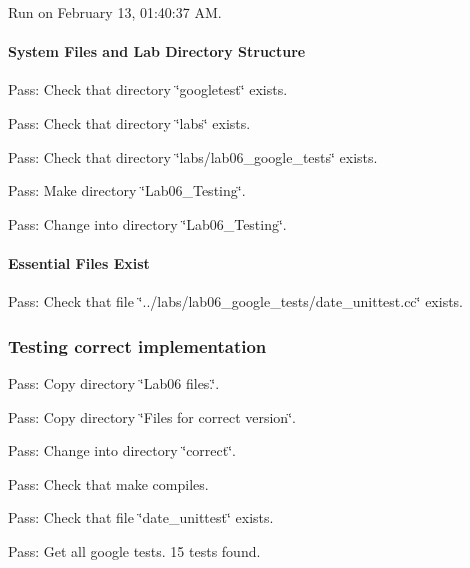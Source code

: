 Run on February 13, 01\+:40\+:37 AM.

\paragraph*{System Files and Lab Directory Structure}


\begin{DoxyItemize}
\item Pass\+: Check that directory \char`\"{}googletest\char`\"{} exists.
\item Pass\+: Check that directory \char`\"{}labs\char`\"{} exists.
\item Pass\+: Check that directory \char`\"{}labs/lab06\+\_\+google\+\_\+tests\char`\"{} exists.
\item Pass\+: Make directory \char`\"{}\+Lab06\+\_\+\+Testing\char`\"{}.
\item Pass\+: Change into directory \char`\"{}\+Lab06\+\_\+\+Testing\char`\"{}.
\end{DoxyItemize}

\paragraph*{Essential Files Exist}


\begin{DoxyItemize}
\item Pass\+: Check that file \char`\"{}../labs/lab06\+\_\+google\+\_\+tests/date\+\_\+unittest.\+cc\char`\"{} exists.
\end{DoxyItemize}

\subsubsection*{Testing correct implementation}


\begin{DoxyItemize}
\item Pass\+: Copy directory \char`\"{}\+Lab06 files.\char`\"{}.
\item Pass\+: Copy directory \char`\"{}\+Files for correct version\char`\"{}.
\item Pass\+: Change into directory \char`\"{}correct\char`\"{}.
\item Pass\+: Check that make compiles.
\item Pass\+: Check that file \char`\"{}date\+\_\+unittest\char`\"{} exists.
\item Pass\+: Get all google tests. 15 tests found.
\end{DoxyItemize}

